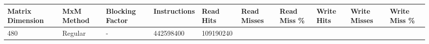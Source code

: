 \documentclass[11pt]{article}
\begin{document}
\begin{longtable}[]{@{}llllllllll@{}}
\toprule
\begin{minipage}[b]{0.09\columnwidth}\raggedright\strut
Matrix Dimension\strut
\end{minipage} & \begin{minipage}[b]{0.06\columnwidth}\raggedright\strut
MxM Method\strut
\end{minipage} & \begin{minipage}[b]{0.09\columnwidth}\raggedright\strut
Blocking Factor\strut
\end{minipage} & \begin{minipage}[b]{0.07\columnwidth}\raggedright\strut
Instructions\strut
\end{minipage} & \begin{minipage}[b]{0.06\columnwidth}\raggedright\strut
Read Hits\strut
\end{minipage} & \begin{minipage}[b]{0.07\columnwidth}\raggedright\strut
Read Misses\strut
\end{minipage} & \begin{minipage}[b]{0.07\columnwidth}\raggedright\strut
Read Miss \%\strut
\end{minipage} & \begin{minipage}[b]{0.06\columnwidth}\raggedright\strut
Write Hits\strut
\end{minipage} & \begin{minipage}[b]{0.07\columnwidth}\raggedright\strut
Write Misses\strut
\end{minipage} & \begin{minipage}[b]{0.07\columnwidth}\raggedright\strut
Write Miss \%\strut
\end{minipage}\tabularnewline
\midrule
\endhead
\begin{minipage}[t]{0.09\columnwidth}\raggedright\strut
480\strut
\end{minipage} & \begin{minipage}[t]{0.06\columnwidth}\raggedright\strut
Regular\strut
\end{minipage} & \begin{minipage}[t]{0.09\columnwidth}\raggedright\strut
-\strut
\end{minipage} & \begin{minipage}[t]{0.07\columnwidth}\raggedright\strut
442598400\strut
\end{minipage} & \begin{minipage}[t]{0.06\columnwidth}\raggedright\strut
109190240\strut

\end{minipage}
\end{longtable}
\end{document}
